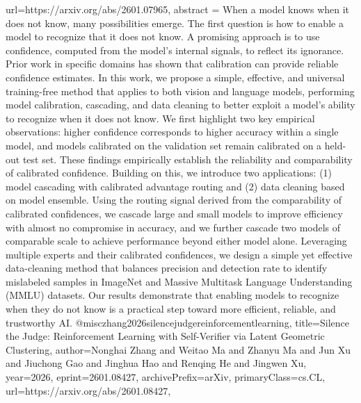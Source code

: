 {      url={https://arxiv.org/abs/2601.07965},
      abstract = {When a model knows when it does not know, many possibilities emerge. The first question is how to enable a model to recognize that it does not know. A promising approach is to use confidence, computed from the model's internal signals, to reflect its ignorance. Prior work in specific domains has shown that calibration can provide reliable confidence estimates. In this work, we propose a simple, effective, and universal training-free method that applies to both vision and language models, performing model calibration, cascading, and data cleaning to better exploit a model's ability to recognize when it does not know. We first highlight two key empirical observations: higher confidence corresponds to higher accuracy within a single model, and models calibrated on the validation set remain calibrated on a held-out test set. These findings empirically establish the reliability and comparability of calibrated confidence. Building on this, we introduce two applications: (1) model cascading with calibrated advantage routing and (2) data cleaning based on model ensemble. Using the routing signal derived from the comparability of calibrated confidences, we cascade large and small models to improve efficiency with almost no compromise in accuracy, and we further cascade two models of comparable scale to achieve performance beyond either model alone. Leveraging multiple experts and their calibrated confidences, we design a simple yet effective data-cleaning method that balances precision and detection rate to identify mislabeled samples in ImageNet and Massive Multitask Language Understanding (MMLU) datasets. Our results demonstrate that enabling models to recognize when they do not know is a practical step toward more efficient, reliable, and trustworthy AI.}
}@misc{zhang2026silencejudgereinforcementlearning,
      title={Silence the Judge: Reinforcement Learning with Self-Verifier via Latent Geometric Clustering}, 
      author={Nonghai Zhang and Weitao Ma and Zhanyu Ma and Jun Xu and Jiuchong Gao and Jinghua Hao and Renqing He and Jingwen Xu},
      year={2026},
      eprint={2601.08427},
      archivePrefix={arXiv},
      primaryClass={cs.CL},
      url={https://arxiv.org/abs/2601.08427},
}
